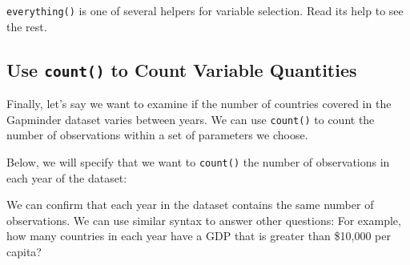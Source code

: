 \documentclass[]{book}
\newenvironment{Shaded}{\begin{snugshade}}{\end{snugshade}}
\newcommand{\KeywordTok}[1]{\textcolor[rgb]{0.13,0.29,0.53}{\textbf{#1}}}
\newcommand{\DecValTok}[1]{\textcolor[rgb]{0.00,0.00,0.81}{#1}}
\newcommand{\StringTok}[1]{\textcolor[rgb]{0.31,0.60,0.02}{#1}}
\newcommand{\CommentTok}[1]{\textcolor[rgb]{0.56,0.35,0.01}{\textit{#1}}}
\newcommand{\OperatorTok}[1]{\textcolor[rgb]{0.81,0.36,0.00}{\textbf{#1}}}
\newcommand{\NormalTok}[1]{#1}
\begin{document}
\texttt{everything()} is one of several helpers for variable selection.
Read its help to see the rest.

\subsection{\texorpdfstring{Use \texttt{count()} to Count Variable
Quantities}{Use count() to Count Variable Quantities}}\label{use-count-to-count-variable-quantities}

Finally, let's say we want to examine if the number of countries covered
in the Gapminder dataset varies between years. We can use
\texttt{count()} to count the number of observations within a set of
parameters we choose.

Below, we will specify that we want to \texttt{count()} the number of
observations in each year of the dataset:

\begin{Shaded}
\end{Shaded}

We can confirm that each year in the dataset contains the same number of
observations. We can use similar syntax to answer other questions: For
example, how many countries in each year have a GDP that is greater than
\$10,000 per capita?

\begin{Shaded}
\end{Shaded}
\end{document}
